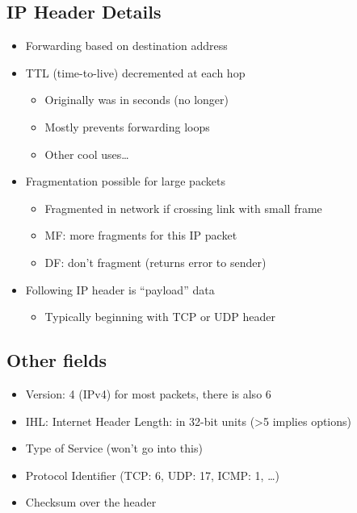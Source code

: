 \subsection{IP Header Details}
\begin{itemize}[nosep]
    \item Forwarding based on destination address
    \item TTL (time-to-live) decremented at each hop
          \begin{itemize}[nosep]
              \item Originally was in seconds (no longer)
              \item Mostly prevents forwarding loops
              \item Other cool uses\dots
          \end{itemize}
    \item Fragmentation possible for large packets
          \begin{itemize}[nosep]
              \item Fragmented in network if crossing link with small frame
              \item MF: more fragments for this IP packet
              \item DF: don't fragment (returns error to sender)
          \end{itemize}
    \item Following IP header is ``payload'' data
          \begin{itemize}[nosep]
              \item Typically beginning with TCP or UDP header
          \end{itemize}
\end{itemize}

\subsection{Other fields}
\begin{itemize}[nosep]
    \item Version: 4 (IPv4) for most packets, there is also 6
    \item IHL: Internet Header Length: in 32-bit units (>5 implies options)
    \item Type of Service (won't go into this)
    \item Protocol Identifier (TCP: 6, UDP: 17, ICMP: 1, \dots)
    \item Checksum over the header
\end{itemize}

